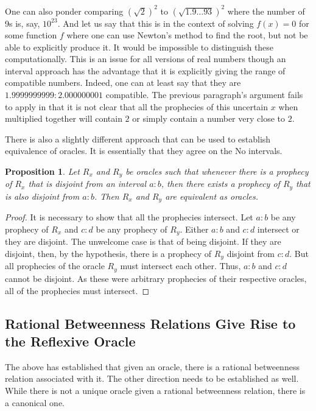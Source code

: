 \documentclass[12pt]{article}
\newtheorem{proposition}{Proposition}[section]
\begin{document}
One can also ponder comparing $(\sqrt{2})^2$ to $(\sqrt{1.9\ldots93})^2$ where the number of 9s is, say, $10^{23}$. And let us say that this is in the context of solving $f(x) = 0$ for some function $f$ where one can use Newton's method to find the root, but not be able to explicitly produce it. It would be impossible to distinguish these computationally. This is an issue for all versions of real numbers though an interval approach has the advantage that it is explicitly giving the range of compatible numbers. Indeed, one can at least say that they are $1.9999999999:2.000000001$ compatible. The previous paragraph's argument fails to apply in that it is not clear that all the prophecies of this uncertain $x$ when multiplied together will contain $2$ or simply contain a number very close to $2$. 

There is also a slightly different approach that can be used to establish equivalence of oracles. It is essentially that they agree on the No intervals. 

\begin{proposition}
    Let $R_x$ and $R_y$ be oracles such that whenever there is a prophecy of $R_x$ that is disjoint from an interval $a:b$, then there exists a prophecy of $R_y$ that is also disjoint from $a:b$. Then $R_x$ and $R_y$ are equivalent as oracles. 
\end{proposition}

\begin{proof}
    It is necessary to show that all the prophecies intersect. Let $a:b$ be any prophecy of $R_x$ and $c:d$ be any prophecy of $R_y$. Either $a:b$ and $c:d$ intersect or they are disjoint. The unwelcome case is that of being disjoint. If they are disjoint, then, by the hypothesis, there is a prophecy of $R_y$ disjoint from $c:d$. But all prophecies of the oracle $R_y$ must intersect each other. Thus,  $a:b$ and $c:d$ cannot be disjoint. As these were arbitrary prophecies of their respective oracles, all of the prophecies must intersect. 
\end{proof}



\subsection{Rational Betweenness Relations Give Rise to the Reflexive Oracle}

The above has established that given an oracle, there is a rational betweenness relation associated with it. The other direction needs to be established as well. While there is not a unique oracle given a rational betweenness relation, there is a canonical one. 
\end{document}
